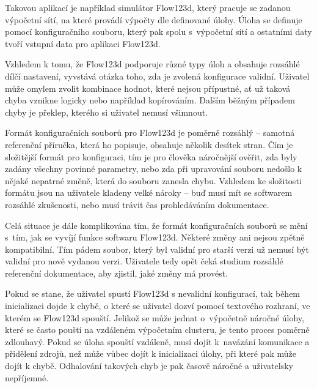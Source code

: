 \documentclass[FM,DP]{tulthesis}
\begin{document}
Takovou aplikací je například simulátor Flow123d, který pracuje se zadanou výpočetní sítí, na které provádí výpočty dle definované úlohy. Úloha se definuje pomocí konfiguračního souboru, který pak spolu s~výpočetní sítí a ostatními daty tvoří vstupní data pro aplikaci Flow123d.

Vzhledem k tomu, že Flow123d podporuje různé typy úloh a obsahuje rozsáhlé dílčí nastavení, vyvstává otázka toho, zda je zvolená konfigurace validní. Uživatel může omylem zvolit kombinace hodnot, které nejsou přípustné, ať už taková chyba vznikne logicky nebo například kopírováním. Dalším běžným případem chyby je překlep, kterého si uživatel nemusí všimnout.


Formát konfiguračních souborů pro Flow123d je poměrně rozsáhlý -- samotná referenční příručka, která ho popisuje, obsahuje několik desítek stran. Čím je složitější formát pro konfiguraci, tím je pro člověka náročnější ověřit, zda byly zadány všechny povinné parametry, nebo zda při upravování souboru nedošlo k nějaké nepatrné změně, která do souboru zanesla chybu. Vzhledem ke složitosti formátu jsou na uživatele kladeny velké nároky -- buď musí mít se softwarem rozsáhlé zkušenosti, nebo musí trávit čas prohledáváním dokumentace.

Celá situace je dále komplikována tím, že formát konfiguračních souborů se mění s~tím, jak se vyvíjí funkce softwaru Flow123d. Některé změny ani nejsou zpětně kompatibilní. Tím pádem soubor, který byl validní pro starší verzi už nemusí být validní pro nově vydanou verzi.
Uživatele tedy opět čeká studium rozsáhlé referenční dokumentace, aby zjistil, jaké změny má provést.

Pokud se stane, že uživatel spustí Flow123d s nevalidní konfigurací, tak během inicializaci dojde k chybě, o které se uživatel dozví pomocí textového rozhraní, ve kterém se Flow123d spouští. Jelikož se může jednat o~výpočetně náročné úlohy, které se často pouští na vzdáleném výpočetním clusteru, je tento proces poměrně zdlouhavý. Pokud se úloha spouští vzdáleně, musí dojít k~navázání komunikace a přidělení zdrojů, než může vůbec dojít k inicializaci úlohy, při které pak může dojít k chybě. Odhalování takových chyb je pak časově náročné a uživatelsky nepříjemné.
\end{document}
